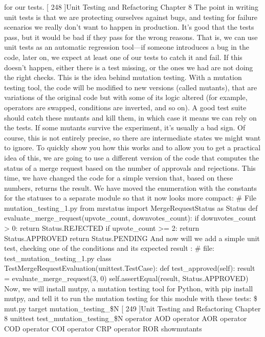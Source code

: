 \documentclass[a4paper,10pt,english]{sphinxmanual}
\begin{document}
for our tests.
{[} 248 {]}Unit Testing and Refactoring
Chapter 8
The point in writing unit tests is that we are protecting ourselves against bugs, and testing
for failure scenarios we really don’t want to happen in production. It’s good that the tests
pass, but it would be bad if they pass for the wrong reasons. That is, we can use unit tests as
an automatic regression tool—if someone introduces a bug in the code, later on, we expect
at least one of our tests to catch it and fail. If this doesn’t happen, either there is a test
missing, or the ones we had are not doing the right checks.
This is the idea behind mutation testing. With a mutation testing tool, the code will be
modified to new versions (called mutants), that are variations of the original code but with
some of its logic altered (for example, operators are swapped, conditions are inverted, and
so on). A good test suite should catch these mutants and kill them, in which case it means
we can rely on the tests. If some mutants survive the experiment, it’s usually a bad sign. Of
course, this is not entirely precise, so there are intermediate states we might want to ignore.
To quickly show you how this works and to allow you to get a practical idea of this, we are
going to use a different version of the code that computes the status of a merge request
based on the number of approvals and rejections. This time, we have changed the code for a
simple version that, based on these numbers, returns the result. We have moved the
enumeration with the constants for the statuses to a separate module so that it now looks
more compact:
\# File mutation\_testing\_1.py
from mrstatus import MergeRequestStatus as Status
def evaluate\_merge\_request(upvote\_count, downvotes\_count):
if downvotes\_count \textgreater{} 0:
return Status.REJECTED
if upvote\_count \textgreater{}= 2:
return Status.APPROVED
return Status.PENDING
And now will we add a simple unit test, checking one of the conditions and its expected
result :
\# file: test\_mutation\_testing\_1.py
class TestMergeRequestEvaluation(unittest.TestCase):
def test\_approved(self):
result = evaluate\_merge\_request(3, 0)
self.assertEqual(result, Status.APPROVED)
Now, we will install mutpy, a mutation testing tool for Python, with pip install mutpy,
and tell it to run the mutation testing for this module with these tests:
\$ mut.py \textendash{}target mutation\_testing\_\$N {[} 249 {]}Unit Testing and Refactoring
Chapter 8
\textendash{}unit\sphinxhyphen{}test test\_mutation\_testing\_\$N \textendash{}operator AOD  \textendash{}operator AOR  \textendash{}operator COD  \textendash{}operator COI  \textendash{}operator CRP  \textendash{}operator ROR  \textendash{}show\sphinxhyphen{}mutants
\end{document}
